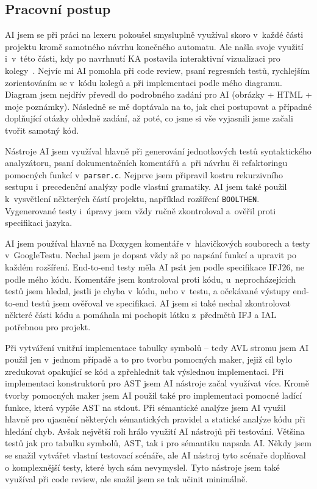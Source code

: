\subsection{Pracovní postup}
\begin{description}[style=nextline]
  \item[Tadeáš Zonyga]
    AI jsem se při práci na lexeru pokoušel smysluplně využíval skoro
    v~každé části projektu kromě samotného návrhu konečného automatu. Ale
    našla svoje využití i~v~této části, kdy po navrhnutí KA postavila
    interaktivní vizualizaci pro kolegy~\cite{ifj26vizualizace}. Nejvíc mi
    AI pomohla při code review, psaní regresních testů, rychlejším
    zorientováním se v~kódu kolegů a při implementaci podle mého diagramu.
    Diagram jsem nejdřív převedl do podrobného zadání pro AI (obrázky + HTML
    + moje poznámky). Následně se mě doptávala na to, jak chci postupovat
    a případné doplňující otázky ohledně zadání, až poté, co jsme si vše
    vyjasnili jsme začali tvořit samotný kód.
  \item[Dušan Popović]
    Nástroje AI jsem využíval hlavně při generování jednotkových testů
    syntaktického analyzátoru, psaní dokumentačních komentářů a~při návrhu či
    refaktoringu pomocných funkcí v~\texttt{parser.c}. Nejprve jsem připravil
    kostru rekurzivního sestupu i~precedenční analýzy podle vlastní gramatiky.
    AI jsem také použil k~vysvětlení některých částí projektu, například
    rozšíření \texttt{BOOLTHEN}. Vygenerované testy i~úpravy jsem vždy ručně
    zkontroloval a~ověřil proti specifikaci jazyka.
  \item[Marek Záchenský]
    AI jsem používal hlavně na Doxygen komentáře v~hlavičkových souborech
    a testy v~GoogleTestu. Nechal jsem je dopsat vždy až po napsání funkcí
    a upravit po každém rozšíření. End-to-end testy měla AI psát jen podle
    specifikace IFJ26, ne podle mého kódu. Komentáře jsem kontroloval proti
    kódu, u~neprocházejících testů jsem hledal, jestli je chyba v~kódu, nebo
    v~testu, a očekávané výstupy end-to-end testů jsem ověřoval ve
    specifikaci. AI jsem si také nechal zkontrolovat některé části kódu
    a pomáhala mi pochopit látku z~předmětů IFJ a IAL potřebnou pro projekt.
  \item[Adam Zatloukal]
    Při vytváření vnitřní implementace tabulky symbolů -- tedy AVL stromu jsem AI použil jen
    v~jednom případě a to pro tvorbu pomocných maker, jejiž cíl bylo zredukovat opakující se kód
    a zpřehlednit tak výslednou implementaci. Při implementaci konstruktorů pro AST jsem AI nástroje
    začal využívat více. Kromě tvorby pomocných maker jsem AI použil také pro implementaci pomocné ladící funkce,
    která vypíše AST na stdout. Při sémantické analýze jsem AI využil hlavně pro ujasnění některých sémantických pravidel
    a statické analýze kódu při hledání chyb. Avšak největší roli hrálo využití AI nástrojů při testování.
    Většina testů jak pro tabulku symbolů, AST, tak i pro sémantiku napsala AI.
    Někdy jsem se snažil vytvářet vlastní testovací scénáře, ale AI nástroj tyto scénaře doplňoval o komplexnější testy, které bych
    sám nevymyslel. Tyto nástroje jsem také využíval při code review, ale snažil jsem se tak učinit minimálně.
\end{description}

